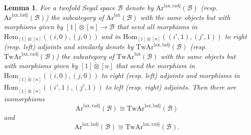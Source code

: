 \documentclass[a4paper, reqno]{amsart}
\newtheorem{lemma}[theorem]{Lemma}
\theoremstyle{definition}
\newcommand\cB{\mathscr B}
\newcommand\mor{\mathrm{Hom}}
\newcommand\arr{\mathrm{Ar}}
\newcommand\lax{\mathrm{lax}}
\newcommand\twar{\mathrm{TwAr}}
\newcommand\ladj{\mathrm{ladj}}
\newcommand\radj{\mathrm{radj}}
\begin{document}
\begin{lemma}\label{lem:twar}
For a twofold Segal space $\cB$ denote by $\arr^{\lax,\radj}(\cB)$ (resp. $\arr^{\lax,\ladj}(\cB)$) the subcategory of $\arr^\lax(\cB)$ with the same objects but with morphisms given by $[1]\otimes[n]\rightarrow\cB$ that send all morphisms in $\mor_{[1]\otimes[n]}((i,0),(j,0))$ and in $\mor_{[1]\otimes[n]}((i',1),(j',1))$  to right (resp. left) adjoints and similarly denote by $\twar^{\lax,\ladj}(\cB)$ (resp. $\twar^{\lax,\radj}(\cB)$) the subcategory of $\twar^\lax(\cB)$ with the same objects but with morphisms given by $[1]\widetilde{\otimes}[n]$ that send the morphism in  $\mor_{[1]\widetilde{\otimes}[n]}((i,0),(j,0))$ to right (resp. left) adjoints and morphisms in $\mor_{[1]\widetilde{\otimes}[n]}((i',1),(j',1))$ to left (resp. right) adjoints. Then there are isomorphisms
\[\arr^{\lax,\radj}(\cB)\cong\twar^{\lax,\ladj}(\cB)\]
and 
\[\arr^{\lax,\ladj}(\cB)\cong\twar^{\lax,\radj}(\cB).\]
\end{lemma}
\end{document}

